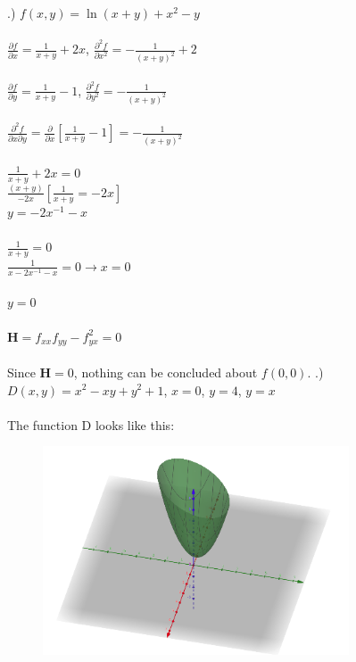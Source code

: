 \documentclass[12pt]{article}
\begin{document}
.) $f(x, y) = \ln(x + y) + x^{2}-y$\\\\
\noindent $\frac{\partial f}{\partial x} = \frac{1}{x+y} + 2x$, \hspace{10pt} $\frac{\partial ^{2} f}{\partial x^{2}} = -\frac{1}{(x + y)^{2}} + 2$\\\\
\noindent $\frac{\partial f}{\partial y} = \frac{1}{x + y} -1 $, \hspace{10pt} $\frac{\partial ^{2} f}{\partial y^{2}} = -\frac{1}{(x + y)^{2}}$\\\\
\noindent $\frac{\partial^{2} f}{\partial x \partial y } = \frac{\partial }{\partial x}[\frac{1}{x+y} -1 ] = -\frac{1}{(x + y)^{2}}$\\\\
\noindent $\frac{1}{x + y} + 2x= 0 $\\
\noindent $\frac{(x + y)}{-2x}[\frac{1}{x + y} = -2x]$\\
\noindent $y = -2x^{-1} - x$\\\\
\noindent $\frac{1}{x + y} = 0$\\
\noindent $\frac{1}{x  -2x^{-1} -x} = 0 \rightarrow x = 0$\\\\
\noindent $y = 0$\\\\
\noindent $\mathbf{H} = f_{xx}f_{yy} - f_{yx}^{2} = 0$\\\\
\noindent Since $\mathbf{H} = 0$, nothing can be concluded about $f(0, 0)$.\clearpage
{}.) $D(x, y) = x^{2} - xy +y^{2} + 1$, \hspace{10pt} $x = 0$, \hspace{10pt} $y = 4$, \hspace{10pt} $y = x$\\\\
\noindent The function D looks like this:\\
\begin{figure}[!h]
\includegraphics{surface.png}
\end{figure}\\
\end{document}

